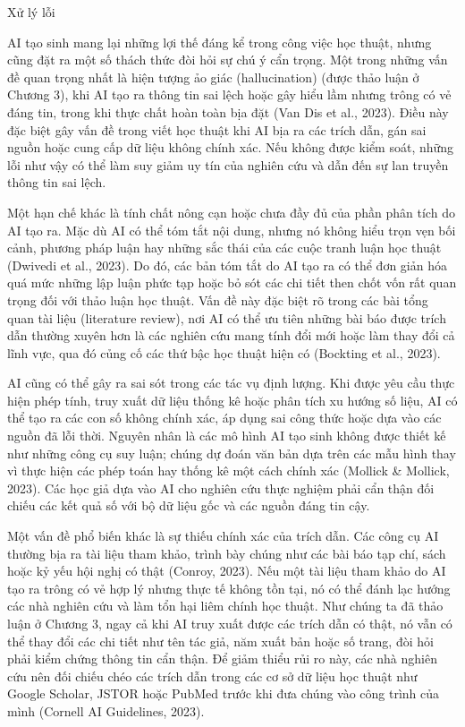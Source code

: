 Xử lý lỗi

AI tạo sinh mang lại những lợi thế đáng kể trong công việc học thuật, nhưng cũng đặt ra một số thách thức đòi hỏi sự chú ý cẩn trọng. Một trong những vấn đề quan trọng nhất là hiện tượng ảo giác (hallucination) (được thảo luận ở Chương 3), khi AI tạo ra thông tin sai lệch hoặc gây hiểu lầm nhưng trông có vẻ đáng tin, trong khi thực chất hoàn toàn bịa đặt (Van Dis et al., 2023). Điều này đặc biệt gây vấn đề trong viết học thuật khi AI bịa ra các trích dẫn, gán sai nguồn hoặc cung cấp dữ liệu không chính xác. Nếu không được kiểm soát, những lỗi như vậy có thể làm suy giảm uy tín của nghiên cứu và dẫn đến sự lan truyền thông tin sai lệch.

Một hạn chế khác là tính chất nông cạn hoặc chưa đầy đủ của phần phân tích do AI tạo ra. Mặc dù AI có thể tóm tắt nội dung, nhưng nó không hiểu trọn vẹn bối cảnh, phương pháp luận hay những sắc thái của các cuộc tranh luận học thuật (Dwivedi et al., 2023). Do đó, các bản tóm tắt do AI tạo ra có thể đơn giản hóa quá mức những lập luận phức tạp hoặc bỏ sót các chi tiết then chốt vốn rất quan trọng đối với thảo luận học thuật. Vấn đề này đặc biệt rõ trong các bài tổng quan tài liệu (literature review), nơi AI có thể ưu tiên những bài báo được trích dẫn thường xuyên hơn là các nghiên cứu mang tính đổi mới hoặc làm thay đổi cả lĩnh vực, qua đó củng cố các thứ bậc học thuật hiện có (Bockting et al., 2023).

AI cũng có thể gây ra sai sót trong các tác vụ định lượng. Khi được yêu cầu thực hiện phép tính, truy xuất dữ liệu thống kê hoặc phân tích xu hướng số liệu, AI có thể tạo ra các con số không chính xác, áp dụng sai công thức hoặc dựa vào các nguồn đã lỗi thời. Nguyên nhân là các mô hình AI tạo sinh không được thiết kế như những công cụ suy luận; chúng dự đoán văn bản dựa trên các mẫu hình thay vì thực hiện các phép toán hay thống kê một cách chính xác (Mollick \& Mollick, 2023). Các học giả dựa vào AI cho nghiên cứu thực nghiệm phải cẩn thận đối chiếu các kết quả số với bộ dữ liệu gốc và các nguồn đáng tin cậy.

Một vấn đề phổ biến khác là sự thiếu chính xác của trích dẫn. Các công cụ AI thường bịa ra tài liệu tham khảo, trình bày chúng như các bài báo tạp chí, sách hoặc kỷ yếu hội nghị có thật (Conroy, 2023). Nếu một tài liệu tham khảo do AI tạo ra trông có vẻ hợp lý nhưng thực tế không tồn tại, nó có thể đánh lạc hướng các nhà nghiên cứu và làm tổn hại liêm chính học thuật. Như chúng ta đã thảo luận ở Chương 3, ngay cả khi AI truy xuất được các trích dẫn có thật, nó vẫn có thể thay đổi các chi tiết như tên tác giả, năm xuất bản hoặc số trang, đòi hỏi phải kiểm chứng thông tin cẩn thận. Để giảm thiểu rủi ro này, các nhà nghiên cứu nên đối chiếu chéo các trích dẫn trong các cơ sở dữ liệu học thuật như Google Scholar, JSTOR hoặc PubMed trước khi đưa chúng vào công trình của mình (Cornell AI Guidelines, 2023).

